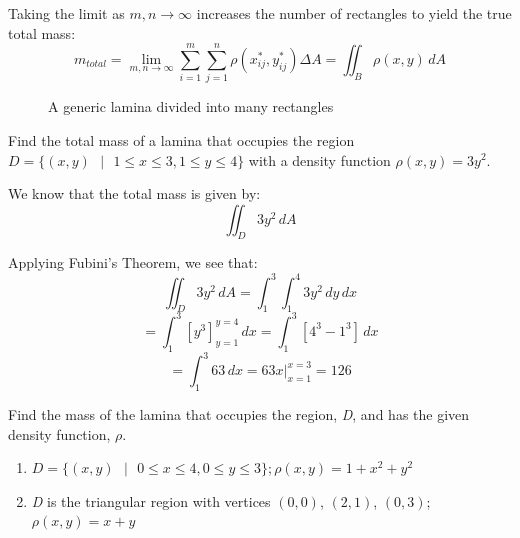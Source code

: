 Taking the limit as $m, n \to \infty$ increases the number of rectangles to 
yield the true total mass:
$$m_{total} = \lim_{m, n \to \infty} \sum_{i = 1}^m \sum_{j = 1}^n \rho (x_{ij
}^*, y_{ij}^*) \Delta A = \iint_{\textit{B}} \rho (x, y)\,dA$$

\begin{figure}[H]
\centering
    \caption{A generic lamina divided into many rectangles}
    \label{fig:laminagrid}
\end{figure}

\begin{Worked}
\begin{Problem}
Find the total mass of a lamina that occupies the region
$\textit{D} = \{ \left( x, y \right) \text{ }| \text{ } 1 \leq x \leq 3, 1 
\leq y \leq 4 \}$ with a density function $\rho (x, y) = 3y^2$. 
\end{Problem}
\begin{Solution}
We know that the total mass is given by:
$$\iint_{\textit{D}} 3y^2\,dA$$

Applying Fubini's Theorem, we see that:
$$\iint_{\textit{D}} 3y^2\,dA = \int_1^3 \int_1^4 3y^2\,dy\,dx$$
$$= \int_1^3 \left[ y^3 \right]_{y = 1}^{y = 4}\,dx = \int_1^3 \left[4^3 - 
1^3 \right]\,dx$$
$$= \int_1^3 63 \,dx = 63x|_{x = 1}^{x = 3} = 126$$
\end{Solution}
\end{Worked}

\begin{Exercise}[title = {Finding Total Mass}, label = total_mass]
Find the mass of the lamina that occupies the region, \textit{D}, and has the 
given density function, $\rho$. 
\begin{enumerate}
\item $\textit{D} = \{(x, y)\text{ }|\text{ } 0 \leq x \leq 4, 0 \leq y \leq 3 
\}; \rho (x, y) = 1 + x^2 + y^2$
\item \textit{D} is the triangular region with vertices $(0, 0)$, $(2, 1)$, 
$(0, 3)$; $\rho (x, y) = x + y$
\end{enumerate}
\vspace{50mm}
\end{Exercise}

